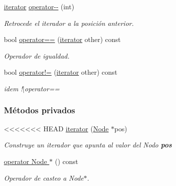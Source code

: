 \begin{DoxyCompactItemize}
\hyperlink{classaed2_1_1map_1_1iterator}{iterator} \hyperlink{classaed2_1_1map_1_1iterator_add45e9ddbb8eeda99326cdb9ac9dd225_add45e9ddbb8eeda99326cdb9ac9dd225}{operator-\/-\/} (int)
\begin{DoxyCompactList}\small\item\em \-Retrocede el iterador a la posición anterior. \end{DoxyCompactList}\item 
bool \hyperlink{classaed2_1_1map_1_1iterator_ad052c1ef8477a1613c292202226053a5_ad052c1ef8477a1613c292202226053a5}{operator==} (\hyperlink{classaed2_1_1map_1_1iterator}{iterator} other) const 
\begin{DoxyCompactList}\small\item\em \-Operador de igualdad. \end{DoxyCompactList}\item 
bool \hyperlink{classaed2_1_1map_1_1iterator_a836c7a166d63f507c4f79085ae953c51_a836c7a166d63f507c4f79085ae953c51}{operator!=} (\hyperlink{classaed2_1_1map_1_1iterator}{iterator} other) const 
\begin{DoxyCompactList}\small\item\em idem !$|$operator== \end{DoxyCompactList}\end{DoxyCompactItemize}
\subsubsection*{\-Métodos privados}
\begin{DoxyCompactItemize}
\item 
<<<<<<< HEAD
\hyperlink{classaed2_1_1map_1_1iterator_ab0ea21abcb32b6d5a72cf341b9029838_ab0ea21abcb32b6d5a72cf341b9029838}{iterator} (\hyperlink{structaed2_1_1map_1_1Node}{\-Node} $\ast$pos)
\begin{DoxyCompactList}\small\item\em \-Construye un iterador que apunta al valor del \-Nodo {\bfseries pos} \end{DoxyCompactList}\item 
\hyperlink{classaed2_1_1map_1_1iterator_a7fe2cdc033cd899dc9fd1da08ac3b39e_a7fe2cdc033cd899dc9fd1da08ac3b39e}{operator Node $\ast$} () const 
\begin{DoxyCompactList}\small\item\em \-Operador de casteo a \-Node$\ast$. \end{DoxyCompactList}\end{DoxyCompactItemize}
